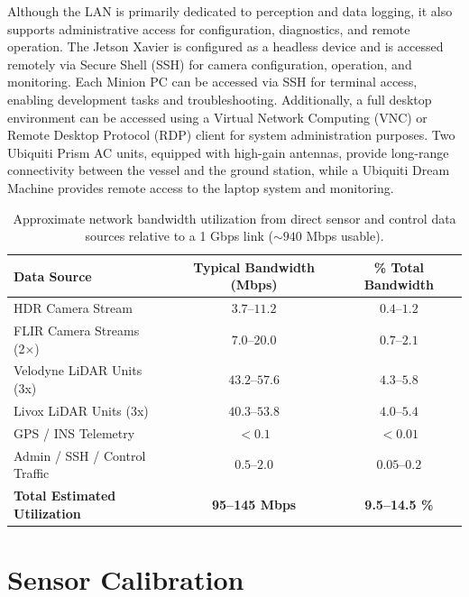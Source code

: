 \documentclass{erauthesis}
\begin{document}
Although the LAN is primarily dedicated to perception and data logging, it also supports administrative access for configuration, diagnostics, and remote operation.
The Jetson Xavier is configured as a headless device and is accessed remotely via Secure Shell (SSH) for camera configuration, operation, and monitoring.
Each Minion PC can be accessed via SSH for terminal access, enabling development tasks and troubleshooting.
Additionally, a full desktop environment can be accessed using a Virtual Network Computing (VNC) or Remote Desktop Protocol (RDP) client for system administration purposes.
Two Ubiquiti Prism AC units, equipped with high-gain antennas, provide long-range connectivity between the vessel and the ground station, while a Ubiquiti Dream Machine provides remote access to the laptop system and monitoring.

\begin{table}[htbp]
\centering
\begin{tabular}{lcc}
\hline
Data Source & Typical Bandwidth (Mbps) & \% Total Bandwidth \\
\hline
\hline
HDR Camera Stream & $3.7$--$11.2$ & $0.4$--$1.2$ \\
FLIR Camera Streams (2×) & $7.0$--$20.0$ & $0.7$--$2.1$ \\
Velodyne LiDAR Units (3x) & $43.2$--$57.6$ & $4.3$--$5.8$ \\
Livox LiDAR Units (3x) & $40.3$--$53.8$ & $4.0$--$5.4$ \\
GPS / INS Telemetry & $<0.1$ & $<0.01$ \\
Admin / SSH / Control Traffic & $0.5$--$2.0$ & $0.05$--$0.2$ \\
\hline
\textbf{Total Estimated Utilization} & \textbf{95--145 Mbps} & \textbf{9.5--14.5 \%} \\
\end{tabular}
\caption{Approximate network bandwidth utilization from direct sensor and control data sources relative to a 1 Gbps link ($\sim940$ Mbps usable).}
\label{table:network_bandwidth}
\end{table}



\section{Sensor Calibration} \label{sec:calibration}
% 
\end{document}

